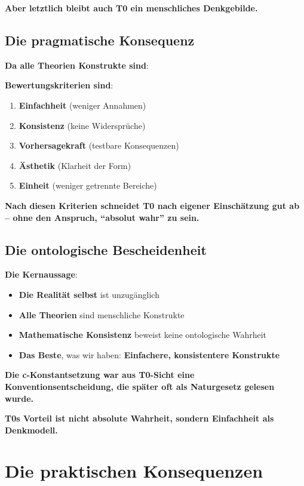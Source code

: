 	\textbf{Aber letztlich bleibt auch T0 ein menschliches Denkgebilde.}
	
	\subsection{Die pragmatische Konsequenz}
	
	\textbf{Da alle Theorien Konstrukte sind}:
	
	\textbf{Bewertungskriterien sind}:
	\begin{enumerate}
		\item \textbf{Einfachheit} (weniger Annahmen)
		\item \textbf{Konsistenz} (keine Widersprüche)
		\item \textbf{Vorhersagekraft} (testbare Konsequenzen)
		\item \textbf{Ästhetik} (Klarheit der Form)
		\item \textbf{Einheit} (weniger getrennte Bereiche)
	\end{enumerate}
	
	\textbf{Nach diesen Kriterien schneidet T0 nach eigener Einschätzung gut ab – ohne den Anspruch, ``absolut wahr'' zu sein.}
	
	\subsection{Die ontologische Bescheidenheit}
	
	\textbf{Die Kernaussage}:
	\begin{itemize}
		\item \textbf{Die Realität selbst} ist unzugänglich
		\item \textbf{Alle Theorien} sind menschliche Konstrukte
		\item \textbf{Mathematische Konsistenz} beweist keine ontologische Wahrheit
		\item \textbf{Das Beste}, was wir haben: \textbf{Einfachere, konsistentere Konstrukte}
	\end{itemize}
	
	\textbf{Die c-Konstantsetzung war aus T0-Sicht eine Konventionsentscheidung, die später oft als Naturgesetz gelesen wurde.}
	
	\textbf{T0s Vorteil ist nicht absolute Wahrheit, sondern Einfachheit als Denkmodell.}
	
	\section{Die praktischen Konsequenzen}
	
